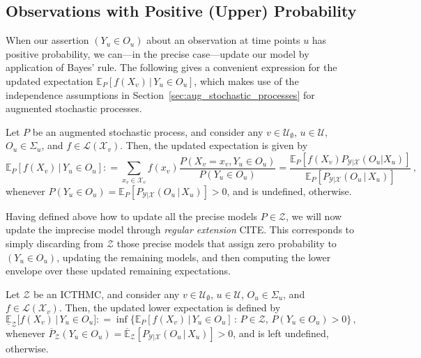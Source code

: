 \documentclass[twoside,11pt]{article}
\newcommand{\states}{\mathcal{X}}
\newcommand{\observs}{\mathcal{Y}}
\newcommand{\gambles}{\mathcal{L}}
\newcommand{\coloneqq}{:\!=}
\begin{document}
\subsection{Observations with Positive (Upper) Probability}

When our assertion $(Y_u\in O_u)$ about an observation at time points $u$ has positive probability, we can---in the precise case---update our model by application of Bayes' rule. The following gives a convenient expression for the updated expectation $\mathbb{E}_P[f(X_v)\,\vert\,Y_u\in O_u]$, which makes use of the independence assumptions in Section~\ref{sec:aug_stochastic_processes} for augmented stochastic processes.

\begin{proposition}\label{prop:precise_conditioning_for_positive}
Let $P$ be an augmented stochastic process, and consider any $v\in\mathcal{U}_\emptyset$, $u\in\mathcal{U}$, $O_u\in\Sigma_u$, and $f\in\gambles(\states_v)$. Then, the updated expectation is given by
\begin{equation*}
\mathbb{E}_P[f(X_v)\,\vert\,Y_u\in O_u] \coloneqq \sum_{x_v\in\states_v}f(x_v)\frac{P(X_v=x_v, Y_u\in O_u)}{P(Y_u\in O_u)} = \frac{\mathbb{E}_P[f(X_v)P_{\observs\vert\states}(O_u\vert X_u)]}{\mathbb{E}_P[P_{\observs\vert\states}(O_u\,\vert\,X_u)]}\,,
\end{equation*}
whenever $P(Y_u\in O_u)=\mathbb{E}_P[P_{\observs\vert\states}(O_u\,\vert\,X_u)]>0$, and is undefined, otherwise.
\end{proposition}

Having defined above how to update all the precise models $P\in\mathcal{Z}$, we will now update the imprecise model through \emph{regular extension} CITE. This corresponds to simply discarding from $\mathcal{Z}$ those precise models that assign zero probability to $(Y_u\in O_u)$, updating the remaining models, and then computing the lower envelope over these updated remaining expectations.

\begin{definition}
Let $\mathcal{Z}$ be an ICTHMC, and consider any $v\in\mathcal{U}_\emptyset$, $u\in\mathcal{U}$, $O_u\in\Sigma_u$, and $f\in\gambles(\states_v)$. Then, the updated lower expectation is defined by
\begin{equation*}
\underline{\mathbb{E}}_{\mathcal{Z}}\bigl[f(X_v)\,\vert\,Y_u\in O_u\bigr] \coloneqq \inf\bigl\{ \mathbb{E}_P[f(X_v)\,\vert\,Y_u\in O_u]\,:\, P\in\mathcal{Z},\, P(Y_u\in O_u)>0 \bigr\}\,,
\end{equation*}
whenever $\overline{P}_\mathcal{Z}(Y_u\in O_u)=\overline{\mathbb{E}}_\mathcal{Z}[P_{\observs\vert\states}(O_u\,\vert\,X_u)]>0$, and is left undefined, otherwise.
%
\end{definition}
\end{document}
